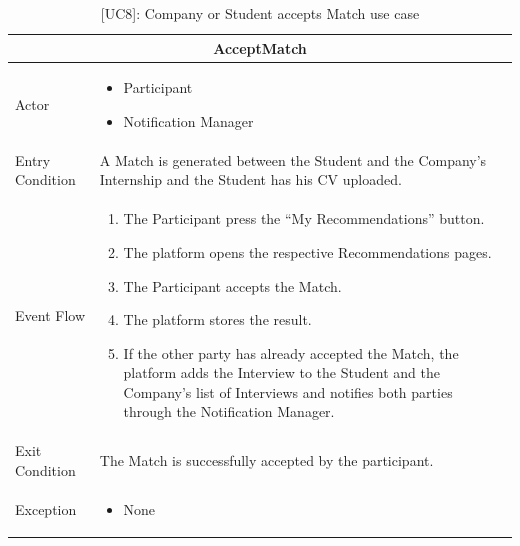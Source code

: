 \begin{table}[H]
    \centering
    \begin{tabular}{|p{3cm}|p{12cm}|}
    \hline
    \multicolumn{2}{|c|}{\textbf{AcceptMatch}} \\ \hline
    Actor & 
    \begin{itemize}
        \item Participant
        \item Notification Manager
    \end{itemize}\\ \hline
    Entry Condition & A Match is generated between the Student and the Company's Internship and the Student has his CV uploaded. \\ \hline
    Event Flow &  
    \begin{enumerate}
        \item The Participant press the “My Recommendations” button.
        \item The platform opens the respective Recommendations pages.
        \item The Participant accepts the Match.
        \item The platform stores the result.
        \item If the other party has already accepted the Match, the platform adds the Interview to the Student and the Company's list of Interviews and notifies both parties through the Notification Manager.
    \end{enumerate} \\ \hline
    Exit Condition & The Match is successfully accepted by the participant.\\ \hline
    Exception & 
    \begin{itemize}
        \item None
    \end{itemize} \\ \hline
    \end{tabular}
    \caption{[UC8]: Company or Student accepts Match use case}
    \label{tab:UC8}
\end{table}

